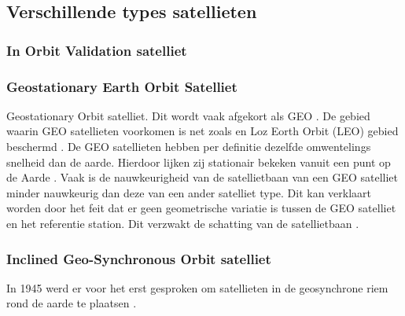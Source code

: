 \subsection{Verschillende types satellieten}
\label{LVTS}
\subsubsection{In Orbit Validation satelliet}
\subsubsection{Geostationary Earth Orbit Satelliet}
Geostationary Orbit satelliet. Dit wordt vaak afgekort als GEO \cite{LBibGEO,LBibMEO}. De gebied waarin GEO satellieten voorkomen is net zoals en Loz Eorth Orbit (LEO) gebied beschermd \cite{LBibMEO}. De GEO satellieten hebben per definitie dezelfde omwentelings snelheid dan de aarde. Hierdoor lijken zij stationair bekeken vanuit een punt op de Aarde \cite{LBibGEO}.  Vaak is de nauwkeurigheid van de satellietbaan van een GEO satelliet minder nauwkeurig dan deze van een ander satelliet type. Dit kan verklaart worden door het feit dat er geen geometrische variatie is tussen de GEO satelliet en het referentie station. Dit verzwakt de schatting van de satellietbaan \cite{LBibPPP2}.

\subsubsection{Inclined Geo-Synchronous Orbit satelliet}
In 1945 werd er voor het erst gesproken om satellieten in de geosynchrone riem rond de aarde te plaatsen \cite{LBibIGSO}.
 
